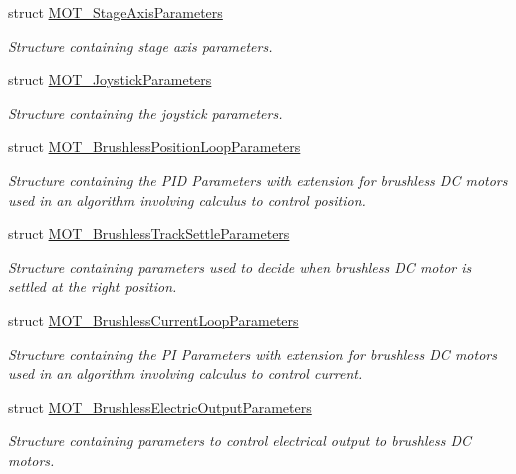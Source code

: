 \begin{DoxyCompactItemize}
struct \hyperlink{struct_m_o_t___stage_axis_parameters}{M\+O\+T\+\_\+\+Stage\+Axis\+Parameters}
\begin{DoxyCompactList}\small\item\em Structure containing stage axis parameters. \end{DoxyCompactList}\item 
struct \hyperlink{struct_m_o_t___joystick_parameters}{M\+O\+T\+\_\+\+Joystick\+Parameters}
\begin{DoxyCompactList}\small\item\em Structure containing the joystick parameters. \end{DoxyCompactList}\item 
struct \hyperlink{struct_m_o_t___brushless_position_loop_parameters}{M\+O\+T\+\_\+\+Brushless\+Position\+Loop\+Parameters}
\begin{DoxyCompactList}\small\item\em Structure containing the P\+ID Parameters with extension for brushless DC motors used in an algorithm involving calculus to control position. \end{DoxyCompactList}\item 
struct \hyperlink{struct_m_o_t___brushless_track_settle_parameters}{M\+O\+T\+\_\+\+Brushless\+Track\+Settle\+Parameters}
\begin{DoxyCompactList}\small\item\em Structure containing parameters used to decide when brushless DC motor is settled at the right position. \end{DoxyCompactList}\item 
struct \hyperlink{struct_m_o_t___brushless_current_loop_parameters}{M\+O\+T\+\_\+\+Brushless\+Current\+Loop\+Parameters}
\begin{DoxyCompactList}\small\item\em Structure containing the PI Parameters with extension for brushless DC motors used in an algorithm involving calculus to control current. \end{DoxyCompactList}\item 
struct \hyperlink{struct_m_o_t___brushless_electric_output_parameters}{M\+O\+T\+\_\+\+Brushless\+Electric\+Output\+Parameters}
\begin{DoxyCompactList}\small\item\em Structure containing parameters to control electrical output to brushless DC motors. \end{DoxyCompactList}\end{DoxyCompactItemize}

